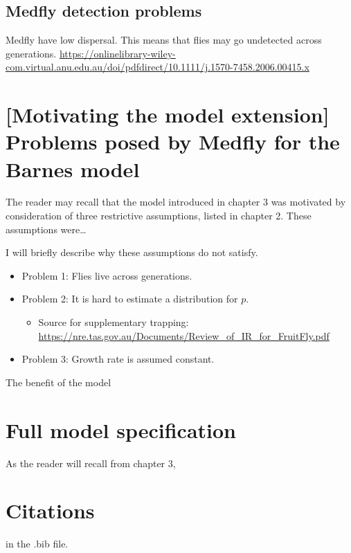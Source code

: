 \documentclass[
]{book}
\providecommand{\tightlist}{%
  \setlength{\itemsep}{0pt}\setlength{\parskip}{0pt}}
\begin{document}
\hypertarget{medfly-detection-problems}{%
\subsection{Medfly detection problems}\label{medfly-detection-problems}}

Medfly have low dispersal. This means that flies may go undetected across generations.
\url{https://onlinelibrary-wiley-com.virtual.anu.edu.au/doi/pdfdirect/10.1111/j.1570-7458.2006.00415.x}

\hypertarget{motivating-the-model-extension-problems-posed-by-medfly-for-the-barnes-model}{%
\section{{[}Motivating the model extension{]} Problems posed by Medfly for the Barnes model}\label{motivating-the-model-extension-problems-posed-by-medfly-for-the-barnes-model}}

The reader may recall that the model introduced in chapter 3 was motivated by consideration of three restrictive assumptions, listed in chapter 2. These assumptions were\ldots{}

I will briefly describe why these assumptions do not satisfy.

\begin{itemize}
\tightlist
\item
  Problem 1: Flies live across generations.
\item
  Problem 2: It is hard to estimate a distribution for \(p\).

  \begin{itemize}
  \tightlist
  \item
    Source for supplementary trapping: \url{https://nre.tas.gov.au/Documents/Review_of_IR_for_FruitFly.pdf}
  \end{itemize}
\item
  Problem 3: Growth rate is assumed constant.
\end{itemize}

The benefit of the model

\hypertarget{full-model-specification}{%
\section{Full model specification}\label{full-model-specification}}

As the reader will recall from chapter 3,

\hypertarget{citations}{%
\section{Citations}\label{citations}}

\citep{xie2015} in the .bib file.

  
\end{document}
